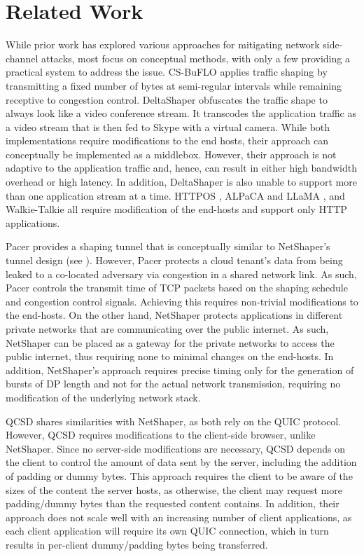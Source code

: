 \section{Related Work}
\label{sec:netshaper-related-work}

While prior work has explored various approaches for mitigating network side-channel attacks, most focus on conceptual methods, with only a few providing a practical system to address the issue.
CS-BuFLO \cite{cai2014csbuflo} applies traffic shaping by transmitting a fixed number of bytes at semi-regular intervals while remaining receptive to congestion control.
DeltaShaper \cite{barradas2017deltashaper} obfuscates the traffic shape to always look like a video conference stream.
It transcodes the application traffic as a video stream that is then fed to Skype with a virtual camera.
While both implementations require modifications to the end hosts, their approach can conceptually be implemented as a middlebox.
However, their approach is not adaptive to the application traffic and, hence, can result in either high bandwidth overhead or high latency.
In addition, DeltaShaper is also unable to support more than one application stream at a time.
HTTPOS \cite{luo2011httpos}, ALPaCA and LLaMA \cite{cherubin2017llama}, and Walkie-Talkie \cite{wang2017walkie} all require modification of the end-hosts and support only HTTP applications.

Pacer \cite{mehta2022pacer} provides a shaping tunnel that is conceptually similar to NetShaper's tunnel design (see ).
However, Pacer protects a cloud tenant's data from being leaked to a co-located adversary via congestion in a shared network link.
As such, Pacer controls the transmit time of TCP packets based on the shaping schedule and congestion control signals.
Achieving this requires non-trivial modifications to the end-hosts.
On the other hand, NetShaper protects applications in different private networks that are communicating over the public internet. 
As such, NetShaper can be placed as a gateway for the private networks to access the public internet, thus requiring none to minimal changes on the end-hosts.
In addition, NetShaper's approach requires precise timing only for the generation of bursts of DP length and not for the actual network transmission, requiring no modification of the underlying network stack.

QCSD \cite{smith2022qcsd} shares similarities with NetShaper, as both rely on the QUIC protocol. 
However, QCSD requires modifications to the client-side browser, unlike NetShaper. 
Since no server-side modifications are necessary, QCSD depends on the client to control the amount of data sent by the server, including the addition of padding or dummy bytes.
This approach requires the client to be aware of the sizes of the content the server hosts, as otherwise, the client may request more padding/dummy bytes than the requested content contains.
In addition, their approach does not scale well with an increasing number of client applications, as each client application will require its own QUIC connection, which in turn results in per-client dummy/padding bytes being transferred.

